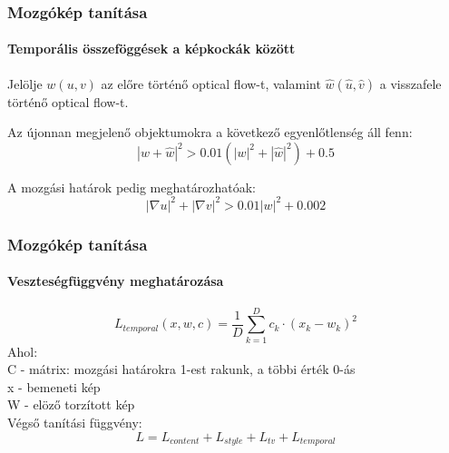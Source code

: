 \documentclass{beamer}
\begin{document}
	\begin{frame}
		\frametitle{Mozgókép tanítása}
		\framesubtitle{Temporális összeföggések a képkockák között}
		
		Jelölje \(w(u, v)\) az előre történő optical flow-t, valamint \(\hat{w}(\hat{u}, \hat{v})\) a visszafele történő optical flow-t.
		
		Az újonnan megjelenő objektumokra a következő egyenlőtlenség áll fenn:
		\begin{equation} \label{eq:1}
			|w + \hat{w}|^2 > 0.01(|w|^2 + |\hat{w}|^2) + 0.5
		\end{equation}
		
		A mozgási határok pedig meghatározhatóak:
		\begin{equation} \label{eq:2}
			|\nabla u|^2 + |\nabla v|^2 > 0.01|w|^2 + 0.002
		\end{equation}
		
		\begin{figure}[!htbp]
			\centering
			\hspace{0mm}
			\label{consistency_weights}
		\end{figure}
		
	\end{frame}

	\begin{frame}
		\frametitle{Mozgókép tanítása}
		\framesubtitle{Veszteségfüggvény meghatározása}
		
		\begin{equation} \label{eq:2}
			L_{temporal}(x, w, c) = \frac{1}{D}\sum_{k=1}^{D}c_k\cdot(x_k-w_k)^2
		\end{equation}
		Ahol: \\ 
		C - mátrix: mozgási határokra 1-est rakunk, a többi érték 0-ás \\
		x - bemeneti kép \\
		W - elöző torzított kép \\
		\vspace{1cm}
		Végső tanítási függvény:
		\begin{equation}
			L = L_{content} + L_{style} + L_{tv} + L_{temporal}
		\end{equation}
		
	\end{frame}
\end{document}
